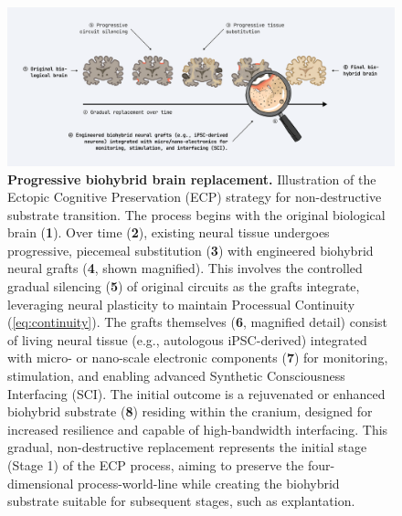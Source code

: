 \documentclass[10pt]{article}
\begin{document}
\begin{sloppypar}
  \begin{figure}[ht]
    \centering
    \includegraphics[width=\textwidth]{figures/ecp-brain-replacement.png}
    \caption[ECP: Progressive biohybrid brain replacement]{\textbf{Progressive biohybrid brain replacement.} Illustration of the Ectopic Cognitive Preservation (ECP) strategy for non-destructive substrate transition. The process begins with the original biological brain (\textbf{1}). Over time (\textbf{2}), existing neural tissue undergoes progressive, piecemeal substitution (\textbf{3}) with engineered biohybrid neural grafts (\textbf{4}, shown magnified). This involves the controlled gradual silencing (\textbf{5}) of original circuits as the grafts integrate, leveraging neural plasticity to maintain Processual Continuity (\autoref{eq:continuity}). The grafts themselves (\textbf{6}, magnified detail) consist of living neural tissue (e.g., autologous iPSC-derived) integrated with micro- or nano-scale electronic components (\textbf{7}) for monitoring, stimulation, and enabling advanced Synthetic Consciousness Interfacing (SCI). The initial outcome is a rejuvenated or enhanced biohybrid substrate (\textbf{8}) residing within the cranium, designed for increased resilience and capable of high-bandwidth interfacing. This gradual, non-destructive replacement represents the initial stage (Stage 1) of the ECP process, aiming to preserve the four-dimensional process-world-line while creating the biohybrid substrate suitable for subsequent stages, such as explantation.}
    \label{fig:ecp-replacement}
  \end{figure}


\end{sloppypar}
\end{document}
